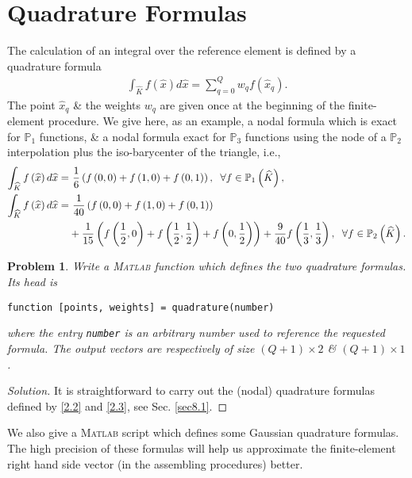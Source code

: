 \documentclass[11pt,a4paper,center,notitlepage]{article}
\numberwithin{equation}{section}
\newtheorem{prob}{Problem}[section]
\begin{document}
\section{Quadrature Formulas}
The calculation of an integral over the reference element is defined by a quadrature formula
\begin{align}
\int_{\widehat K} {f\left( {\widehat x} \right)d\widehat x}  = \sum\limits_{q = 0}^Q {{w_q}f\left( {{{\widehat x}_q}} \right)} .
\end{align}
The point ${\widehat x}_q$ \& the weights $w_q$ are given once at the beginning of the finite-element procedure. We give here, as an example, a nodal formula which is exact for $\mathbb{P}_1$ functions, \& a nodal formula exact for $\mathbb{P}_3$ functions using the node of a $\mathbb{P}_2$ interpolation plus the iso-barycenter of the triangle, i.e.,
\begin{align}
\label{2.2}
\int_{\widehat K} {f\left( {\widehat x} \right)d\widehat x}  =&\ \frac{1}{6}\left( {f\left( {0,0} \right) + f\left( {1,0} \right) + f\left( {0,1} \right)} \right),\hspace{2mm}\forall f \in {\mathbb{P}_1}\left( {\widehat K} \right),\\
\int_{\widehat K} {f\left( {\widehat x} \right)d\widehat x}  =&\ \frac{1}{{40}}\left( {f\left( {0,0} \right) + f\left( {1,0} \right) + f\left( {0,1} \right)} \right) \nonumber\\
& + \frac{1}{{15}}\left( {f\left( {\frac{1}{2},0} \right) + f\left( {\frac{1}{2},\frac{1}{2}} \right) + f\left( {0,\frac{1}{2}} \right)} \right) + \frac{9}{{40}}f\left( {\frac{1}{3},\frac{1}{3}} \right),\hspace{2mm} \forall f \in {\mathbb{P}_2}\left( {\widehat K} \right). \label{2.3}
\end{align}

\begin{prob}
Write a \textsc{Matlab} function which defines the two quadrature formulas. Its head is 
\begin{verbatim}
function [points, weights] = quadrature(number)
\end{verbatim}
where the entry \verb|number| is an arbitrary number used to reference the requested formula. The output vectors are respectively of size $\left(Q+1\right) \times 2$ \& $\left(Q+1\right) \times 1$.
\end{prob}

\begin{proof}[Solution]
It is straightforward to carry out the (nodal) quadrature formulas defined by \eqref{2.2} and \eqref{2.3}, see Sec. \ref{sec8.1}.
\end{proof}
We also give a \textsc{Matlab} script which defines some Gaussian quadrature formulas. The high precision of these formulas will help us approximate the finite-element right hand side vector (in the assembling procedures) better.
\end{document}
